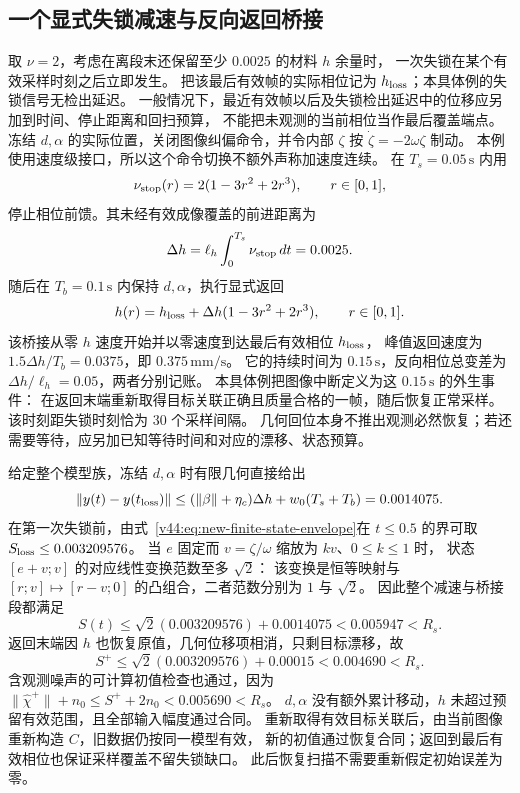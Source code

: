 \documentclass[11pt,a4paper]{article}
\numberwithin{equation}{section}
\theoremstyle{definition}
\begin{document}
\subsection{一个显式失锁减速与反向返回桥接}
取 $\nu=2$，考虑在离段末还保留至少 $0.0025$ 的材料 $h$ 余量时，
一次失锁在某个有效采样时刻之后立即发生。
把该最后有效帧的实际相位记为 $h_{\rm loss}$；本具体例的失锁信号无检出延迟。
一般情况下，最近有效帧以后及失锁检出延迟中的位移应另加到时间、停止距离和回扫预算，
不能把未观测的当前相位当作最后覆盖端点。
冻结 $d,\alpha$ 的实际位置，关闭图像纠偏命令，并令内部 $\zeta$ 按
$\dot\zeta=-2\omega\zeta$ 制动。
本例使用速度级接口，所以这个命令切换不额外声称加速度连续。
在 $T_s=0.05\,\mathrm{s}$ 内用
\begin{equation}
 \nu_{\rm stop}(r)=2(1-3r^2+2r^3),\qquad r\in[0,1],
\end{equation}
停止相位前馈。其未经有效成像覆盖的前进距离为
\begin{equation}
 \Delta h=\ell_h\int_0^{T_s}\nu_{\rm stop}\,dt
         =0.0025.
\end{equation}
随后在 $T_b=0.1\,\mathrm{s}$ 内保持 $d,\alpha$，执行显式返回
\begin{equation}
 h(r)=h_{\rm loss}+\Delta h(1-3r^2+2r^3),\qquad r\in[0,1].
\end{equation}
该桥接从零 $h$ 速度开始并以零速度到达最后有效相位 $h_{\rm loss}$，
峰值返回速度为 $1.5\Delta h/T_b=0.0375$，即 $0.375\,\mathrm{mm/s}$。
它的持续时间为 $0.15\,\mathrm{s}$，反向相位总变差为
$\Delta h/\ell_h=0.05$，两者分别记账。
本具体例把图像中断定义为这 $0.15\,\mathrm{s}$ 的外生事件：
在返回末端重新取得目标关联正确且质量合格的一帧，随后恢复正常采样。
该时刻距失锁时刻恰为 $30$ 个采样间隔。
几何回位本身不推出观测必然恢复；若还需要等待，应另加已知等待时间和对应的漂移、状态预算。

给定整个模型族，冻结 $d,\alpha$ 时有限几何直接给出
\begin{equation}
 \|y(t)-y(t_{\rm loss})\|
 \le(\|\beta\|+\eta_c)\Delta h+w_0(T_s+T_b)
 =0.0014075.
\end{equation}
在第一次失锁前，由式~\eqref{v44:eq:new-finite-state-envelope}在 $t\le0.5$ 的界可取
$S_{\rm loss}\le0.003209576$。
当 $e$ 固定而 $v=\zeta/\omega$ 缩放为 $kv$、$0\le k\le1$ 时，
状态 $[e+v;v]$ 的对应线性变换范数至多 $\sqrt2$：
该变换是恒等映射与 $[r;v]\mapsto[r-v;0]$ 的凸组合，二者范数分别为 $1$ 与 $\sqrt2$。
因此整个减速与桥接段都满足
\begin{equation}
 S(t)\le\sqrt2(0.003209576)+0.0014075
     <0.005947<R_s.
 \label{v44:eq:explicit-bridge-state-bound}
\end{equation}
返回末端因 $h$ 也恢复原值，几何位移项相消，只剩目标漂移，故
\begin{equation}
S^+\le\sqrt2(0.003209576)+0.00015<0.004690<R_s.
\end{equation}
含观测噪声的可计算初值检查也通过，因为
$\|\widehat\chi^+\|+n_0\le S^++2n_0<0.005690<R_s$。
$d,\alpha$ 没有额外累计移动，$h$ 未超过预留有效范围，且全部输入幅度通过合同。
重新取得有效目标关联后，由当前图像重新构造 $C$，旧数据仍按同一模型有效，
新的初值通过恢复合同；返回到最后有效相位也保证采样覆盖不留失锁缺口。
此后恢复扫描不需要重新假定初始误差为零。
\end{document}
